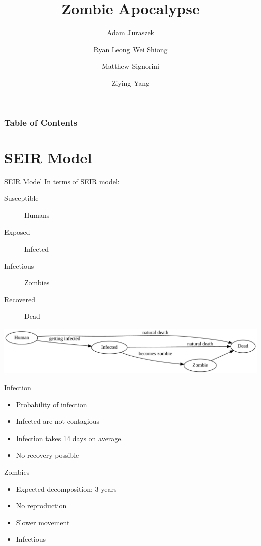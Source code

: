 \documentclass{beamer}
\title{Zombie Apocalypse}
\author{Adam Juraszek \and Ryan Leong Wei Shiong \and Matthew Signorini \and Ziying Yang}
\institute{The University of Melbourne}
\begin{document}
\begin{frame}
    \titlepage
\end{frame}

\begin{frame}
    \frametitle{Table of Contents}
    \tableofcontents
\end{frame}

\section{SEIR Model}

\begin{frame}{SEIR Model}
    In terms of SEIR model:
    \begin{description}
        \item[Susceptible] Humans
        \item[Exposed] Infected
        \item[Infectious] Zombies
        \item[Recovered] Dead
    \end{description}

    \begin{center}
        \includegraphics[width=\textwidth]{model}
    \end{center}
\end{frame}

\begin{frame}{Infection}
    \begin{itemize}
        \item Probability of infection
        \item Infected are not contagious
        \item Infection takes 14 days on average.
        \item No recovery possible
    \end{itemize}
\end{frame} 

\begin{frame}{Zombies}
    \begin{itemize}
        \item Expected decomposition: 3 years
        \item No reproduction
        \item Slower movement
        \item Infectious
    \end{itemize}
\end{frame}
\end{document}
